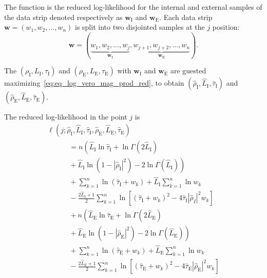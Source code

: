 \documentclass[journal]{IEEEtran}
\begin{document}
The function is the reduced log-likelihood for the internal and external samples of the data strip denoted respectively as $\bm w_\text{I}$ and $\bm w_\text{E}$. Each data strip $\bm w = (w_1,w_2,\dots,w_n)$ is split into two disjointed samples at the $j$ position:
$$
\bm w = (\underbrace{w_1,w_2,\dots,w_j}_{\bm w_\text{I}}, 
\underbrace{w_{j+1}, w_{j+2},\dots,w_n}_{\bm w_\text{E}}).
$$

The $(\rho_\text{I},L_\text{I}, \tau_\text{I})$ and $(\rho_\text{E},L_\text{E}, \tau_\text{E})$ with $\bm w_\text{I}$ and $\bm w_\text{E}$ are guested maximizing~\eqref{eq:eq_log_vero_mag_prod_red}, to obtain $(\widehat{\rho}_\text{I}, \widehat{L}_\text{I}, \widehat{\tau}_\text{I})$ and $(\widehat{\rho}_\text{E}, \widehat{L}_\text{E}, \widehat{\tau}_\text{E})$.


The reduced log-likelihood in the point $j$ is
\begin{equation}\label{eq:TotalLogLikelihood}
\begin{array}{l}
\ell(j;\widehat{\rho}_\text{I}, \widehat{L}_\text{I}, \widehat{\tau}_\text{I}, \widehat{\rho}_\text{E}, \widehat{L}_\text{E},\widehat{\tau}_\text{E})\\
{\quad}{\qquad}                         =n\left(\widehat{L}_\text{I}\ln\widehat{\tau}_\text{I} +\ln\Gamma(2\widehat{L}_\text{I})\right.\\
{\quad}{\qquad}                         +\left.\widehat{L}_\text{I}\ln(1-|\widehat{\rho}_\text{I}|^2)-2\ln\Gamma(\widehat{L}_\text{I})\right)\\
{\quad}{\qquad}                         +\sum_{k=1}^{n}\ln(\widehat{\tau}_\text{I}+w_k)+\widehat{L}_\text{I}\sum_{k=1}^{n}\ln w_k\\
{\quad}{\qquad}                 -\frac{2\widehat{L}_\text{I}+1}{2}\sum_{k=1}^{n} \ln\left[(\widehat{\tau}_\text{I}+w_k)^2-4\widehat{\tau}_\text{I}|\widehat{\rho}_{I}|^2w_k\right]\\
{\quad}{\qquad}                         +n\left(\widehat{L}_\text{E}\ln\widehat{\tau}_\text{E}+\ln\Gamma(2\widehat{L}_\text{E})\right.\\
{\quad}{\qquad}                         +\left.\widehat{L}_\text{E}\ln(1-|\widehat{\rho}_\text{E}|^2)-2\ln\Gamma(\widehat{L}_\text{E})\right)\\
{\quad}{\qquad}                         +\sum_{k=1}^{n}\ln(\widehat{\tau}_\text{E}+w_k)+\widehat{L}_\text{E}\sum_{k=1}^{n}\ln w_k\\
{\quad}{\qquad}                         -\frac{2\widehat{L}_\text{E}+1}{2}\sum_{k=1}^{n} \ln\left[(\widehat{\tau}_\text{E}+w_k)^2-4\widehat{\tau}_\text{E}|\widehat{\rho}_\text{E}|^2w_k\right]
\end{array}
\end{equation}
\end{document}
